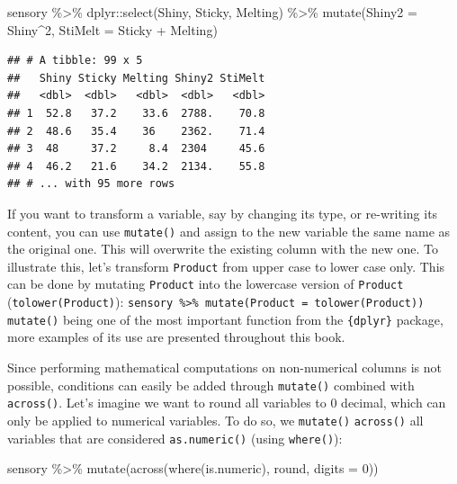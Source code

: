 \documentclass[
]{krantz}
\makeatletter
\newenvironment{Shaded}{\begin{snugshade}}{\end{snugshade}}
\newcommand{\AttributeTok}[1]{\textcolor[rgb]{0.61,0.61,0.61}{#1}}
\newcommand{\DecValTok}[1]{\textcolor[rgb]{0.06,0.06,0.06}{#1}}
\newcommand{\FunctionTok}[1]{\textcolor[rgb]{0,0,0}{#1}}
\newcommand{\NormalTok}[1]{#1}
\newcommand{\SpecialCharTok}[1]{\textcolor[rgb]{0,0,0}{#1}}
\renewenvironment{quote}{\begin{VF}}{\end{VF}}
\newenvironment{kframe}{%
\medskip{}
\setlength{\fboxsep}{.8em}
 \def\at@end@of@kframe{}%
 \ifinner\ifhmode%
  \def\at@end@of@kframe{\end{minipage}}%
  \begin{minipage}{\columnwidth}%
 \fi\fi%
 \def\FrameCommand##1{\hskip\@totalleftmargin \hskip-\fboxsep
 \colorbox{shadecolor}{##1}\hskip-\fboxsep
     \hskip-\linewidth \hskip-\@totalleftmargin \hskip\columnwidth}%
 \MakeFramed {\advance\hsize-\width
   \@totalleftmargin\z@ \linewidth\hsize
   \@setminipage}}%
 {\par\unskip\endMakeFramed%
 \at@end@of@kframe}
\renewenvironment{Shaded}{\begin{kframe}}{\end{kframe}}
\makeatother
\begin{document}
\begin{Shaded}
\begin{Highlighting}[]
\NormalTok{sensory }\SpecialCharTok{\%\textgreater{}\%}
\NormalTok{  dplyr}\SpecialCharTok{::}\FunctionTok{select}\NormalTok{(Shiny, Sticky, Melting) }\SpecialCharTok{\%\textgreater{}\%}
  \FunctionTok{mutate}\NormalTok{(}\AttributeTok{Shiny2 =}\NormalTok{ Shiny}\SpecialCharTok{\^{}}\DecValTok{2}\NormalTok{,}
         \AttributeTok{StiMelt =}\NormalTok{ Sticky }\SpecialCharTok{+}\NormalTok{ Melting)}
\end{Highlighting}
\end{Shaded}

\begin{verbatim}
## # A tibble: 99 x 5
##   Shiny Sticky Melting Shiny2 StiMelt
##   <dbl>  <dbl>   <dbl>  <dbl>   <dbl>
## 1  52.8   37.2    33.6  2788.    70.8
## 2  48.6   35.4    36    2362.    71.4
## 3  48     37.2     8.4  2304     45.6
## 4  46.2   21.6    34.2  2134.    55.8
## # ... with 95 more rows
\end{verbatim}

\begin{quote}
If you want to transform a variable, say by changing its type, or re-writing its content, you can use \texttt{mutate()} and assign to the new variable the same name as the original one. This will overwrite the existing column with the new one. To illustrate this, let's transform \texttt{Product} from upper case to lower case only. This can be done by mutating \texttt{Product} into the lowercase version of \texttt{Product} (\texttt{tolower(Product)}):
\texttt{sensory\ \%\textgreater{}\%\ mutate(Product\ =\ tolower(Product))}
\texttt{mutate()} being one of the most important function from the \texttt{\{dplyr\}} package, more examples of its use are presented throughout this book.
\end{quote}

Since performing mathematical computations on non-numerical columns is not possible, conditions can easily be added through \texttt{mutate()} combined with \texttt{across()}. Let's imagine we want to round all variables to 0 decimal, which can only be applied to numerical variables.
To do so, we \texttt{mutate()} \texttt{across()} all variables that are considered \texttt{as.numeric()} (using \texttt{where()}):

\begin{Shaded}
\begin{Highlighting}[]
\NormalTok{sensory }\SpecialCharTok{\%\textgreater{}\%}
  \FunctionTok{mutate}\NormalTok{(}\FunctionTok{across}\NormalTok{(}\FunctionTok{where}\NormalTok{(is.numeric), round, }\AttributeTok{digits =} \DecValTok{0}\NormalTok{))}
\end{Highlighting}
\end{Shaded}
\end{document}
